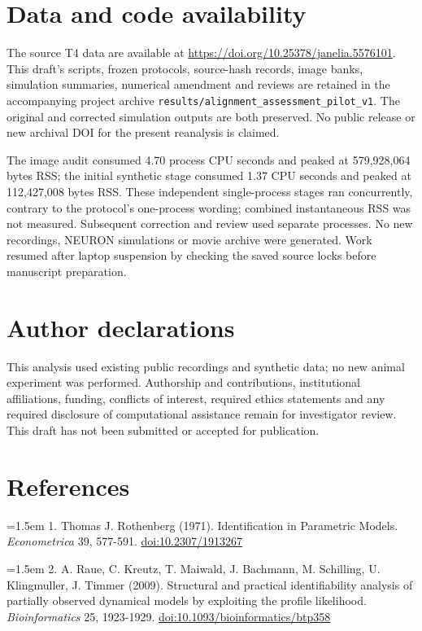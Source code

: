 \documentclass[11pt,letterpaper]{article}
\begin{document}
\section{Data and code availability}

The source T4 data are available at \url{https://doi.org/10.25378/janelia.5576101}. This draft's scripts, frozen protocols, source-hash records, image banks, simulation summaries, numerical amendment and reviews are retained in the accompanying project archive \texttt{results/\allowbreak{}alignment\_\allowbreak{}assessment\_\allowbreak{}pilot\_\allowbreak{}v1}. The original and corrected simulation outputs are both preserved. No public release or new archival DOI for the present reanalysis is claimed.


The image audit consumed 4.70 process CPU seconds and peaked at 579,928,064 bytes RSS; the initial synthetic stage consumed 1.37 CPU seconds and peaked at 112,427,008 bytes RSS. These independent single-process stages ran concurrently, contrary to the protocol's one-process wording; combined instantaneous RSS was not measured. Subsequent correction and review used separate processes. No new recordings, NEURON simulations or movie archive were generated. Work resumed after laptop suspension by checking the saved source locks before manuscript preparation.


\section{Author declarations}

This analysis used existing public recordings and synthetic data; no new animal experiment was performed. Authorship and contributions, institutional affiliations, funding, conflicts of interest, required ethics statements and any required disclosure of computational assistance remain for investigator review. This draft has not been submitted or accepted for publication.


\section{References}

\noindent\hangindent=1.5em 1. Thomas J. Rothenberg (1971). Identification in Parametric Models. \emph{Econometrica} 39, 577-591. \href{https://doi.org/10.2307/1913267}{doi:10.2307/1913267}\par\smallskip

\noindent\hangindent=1.5em 2. A. Raue, C. Kreutz, T. Maiwald, J. Bachmann, M. Schilling, U. Klingmuller, J. Timmer (2009). Structural and practical identifiability analysis of partially observed dynamical models by exploiting the profile likelihood. \emph{Bioinformatics} 25, 1923-1929. \href{https://doi.org/10.1093/bioinformatics/btp358}{doi:10.1093/bioinformatics/btp358}\par\smallskip
\end{document}
